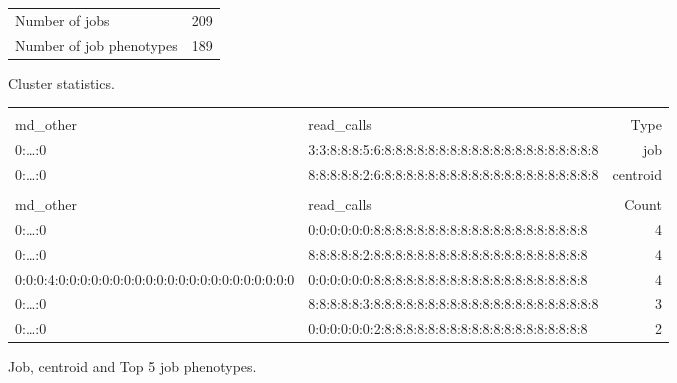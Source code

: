 \documentclass{jhps}
\begin{document}
\noindent\begin{minipage}{\textwidth}
\captionsetup{type=table}

\begingroup
  \begin{subtable}{\textwidth}
  \centering
  \begin{tabular}{ll}
    Number of jobs & 209 \\
    Number of job phenotypes & 189 \\
  \end{tabular}
  \caption{Cluster statistics.}
  \label{tab:use_case:hex_lev:stats}
  \end{subtable}
\endgroup

\medskip

\begingroup
  \begin{subtable}{\textwidth}
  \begin{tiny}
    \begin{tabular}{ll|r}
      \rowcolor{tblhead}
      \multicolumn{2}{l|}{Hexadecimal coding} & \\
      \rowcolor{tblhead}
      md\_other                                           &  read\_calls                                           & Type     \\ 
      \hline
      0:\dots:0                                           &  3:3:8:8:8:5:6:8:8:8:8:8:8:8:8:8:8:8:8:8:8:8:8:8:8:8:8 & job      \\ 
      0:\dots:0                                           &  8:8:8:8:8:2:6:8:8:8:8:8:8:8:8:8:8:8:8:8:8:8:8:8:8:8:8 & centroid \\ 
      \multicolumn{3}{l}{}                                \\ 
      \rowcolor{tblhead}      md\_other                   &  read\_calls                                           & Count    \\ 
      \hline
      0:\dots:0                                           &  0:0:0:0:0:0:8:8:8:8:8:8:8:8:8:8:8:8:8:8:8:8:8:8:8:8   & 4        \\ 
      0:\dots:0                                           &  8:8:8:8:8:2:8:8:8:8:8:8:8:8:8:8:8:8:8:8:8:8:8:8:8:8   & 4        \\ 
      0:0:0:4:0:0:0:0:0:0:0:0:0:0:0:0:0:0:0:0:0:0:0:0:0:0 &  0:0:0:0:0:0:8:8:8:8:8:8:8:8:8:8:8:8:8:8:8:8:8:8:8:8   & 4        \\ 
      0:\dots:0                                           &  8:8:8:8:8:3:8:8:8:8:8:8:8:8:8:8:8:8:8:8:8:8:8:8:8:8:8 & 3        \\ 
      0:\dots:0                                           &  0:0:0:0:0:0:2:8:8:8:8:8:8:8:8:8:8:8:8:8:8:8:8:8:8:8   & 2        \\ 
    \end{tabular}
  \end{tiny}
  \caption{Job, centroid and Top 5 job phenotypes.}
  \label{tab:use_case:hex_lev:top_jobs}
  \end{subtable}
\endgroup


\end{minipage}
\end{document}
